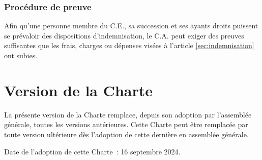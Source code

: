 \documentclass{aediroum}
\newcommand{\article}[1]{article \ref{#1}}
\begin{document}
\subsubsection{Procédure de preuve}\label{sec:procedure-de-preuve}

Afin qu'une personne membre du C.E., sa succession et ses ayants droits puissent se prévaloir des dispositions d'indemnisation, le C.A. peut exiger des preuves suffisantes que les frais, charges ou dépenses visées à l'\article{sec:indemnisation} ont subies.

\section{Version de la Charte}\label{sec:version-de-la-Charte}
La présente version de la Charte remplace, depuis son adoption par l'assemblée générale, toutes les versions antérieures. Cette Charte peut être remplacée par toute version ultérieure dès l'adoption de cette dernière en assemblée générale.

Date de l'adoption de cette Charte~: 16 septembre 2024.
\end{document}
